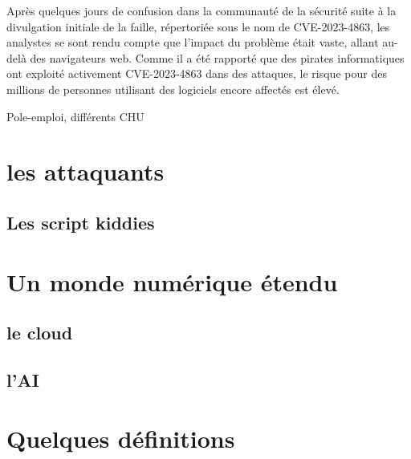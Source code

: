 Après quelques jours de confusion dans la communauté de la sécurité suite à la divulgation initiale de la faille, répertoriée sous le nom de CVE-2023-4863, les analystes se sont rendu compte que l'impact du problème était vaste, allant au-delà des navigateurs web. Comme il a été rapporté que des pirates informatiques ont exploité activement CVE-2023-4863 dans des attaques, le risque pour des millions de personnes utilisant des logiciels encore affectés est élevé.


Pole-emploi, différents CHU


\section{les attaquants}

\subsection{Les script kiddies}

\section{Un monde numérique étendu}


\subsection{le cloud}

\subsection{l'AI}


\section{Quelques définitions}